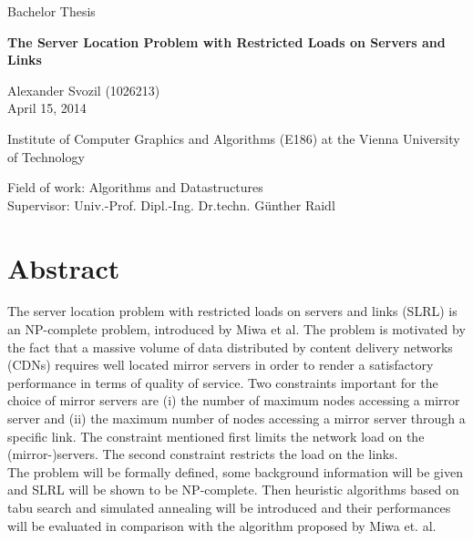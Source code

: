 \documentclass [12pt]{article}
\begin{document}
\vspace{20pt}
\begin{center}
  \fontsize{45pt}{25pt}\selectfont Bachelor Thesis 
\end{center}
\vspace{50pt}
\begin{center}
  \fontsize{55pt}{30pt}\selectfont\textbf{The Server Location Problem with Restricted Loads on Servers and Links} 
\end{center}
\vspace{50pt}

\begin{center}
\large Alexander Svozil (1026213)\\April 15, 2014
\end{center}
\vspace{20pt}
\begin{center}
\large Institute of Computer Graphics and Algorithms (E186) at the Vienna University of Technology 
\end{center}
\vspace{20pt}
\begin{center}
\large Field of work: Algorithms and Datastructures \\ Supervisor: Univ.-Prof. Dipl.-Ing. Dr.techn. Günther Raidl \\
\end{center}
\thispagestyle{empty}
\newpage


\section*{Abstract}
The server location problem with restricted loads on servers and links (SLRL) is an NP-complete
problem, introduced by Miwa et al. The problem 
is motivated by the fact that a massive volume of data distributed by content delivery networks (CDNs) 
requires well located mirror servers in order to render a satisfactory performance in terms of quality of service.
Two constraints important for the choice of mirror servers are (i) the number of maximum nodes
accessing a mirror server and (ii) the maximum number of nodes accessing a mirror server 
through a specific link. The constraint mentioned first limits the network load on
the (mirror-)servers. The second constraint restricts the load on the links.\\
The problem will be formally defined, some background information will be given and SLRL will be shown to be NP-complete.
Then heuristic algorithms based on tabu search and simulated annealing will be introduced and their performances will be evaluated in comparison with the algorithm proposed 
by Miwa et. al. 
\end{document}
